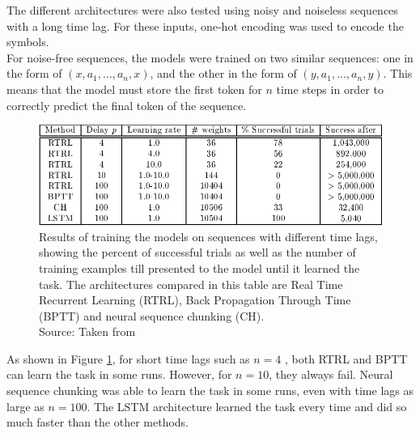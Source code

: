 \documentclass[twoside,a4paper,10pt,DIV=12,BCOR=12mm]{scrartcl}
\begin{document}
The different architectures were also tested using noisy and noiseless sequences with a long time lag.
For these inputs, one-hot encoding was used to encode the symbols.\cite{hochreiter1997lstm, qiu2022onehot}
\\ For noise-free sequences, the models were trained on two similar sequences: one in the form of $(x, a_1, ..., a_n, x)$, and the other in the form of $(y, a_1, ..., a_n, y)$. This means that the model must store the first token for $n$ time steps in order to correctly predict the final token of the sequence.\cite{hochreiter1997lstm}\\
\begin{figure}[h!]
    \centering
    \includegraphics[width=0.75\linewidth]{restask2.png}
    \caption{Results of training the models on sequences with different time lags, showing the percent of successful trials as well as the number of training examples till presented to the model until it learned the task. The architectures compared in this table are Real Time Recurrent Learning (RTRL), Back Propagation Through Time (BPTT) and neural sequence chunking (CH). \\Source: Taken from \cite{hochreiter1997lstm}}
    \label{fig:exp2res}
\end{figure}
As shown in Figure \ref{fig:exp2res}, for short time lags such as $n=4$ , both RTRL and BPTT can learn the task in some runs. However, for $n=10$, they always fail. Neural sequence chunking was able to learn the task in some runs, even with time lags as large as $n=100$. The LSTM architecture learned the task every time and did so much faster than the other methods.\cite{hochreiter1997lstm}\\
\end{document}
